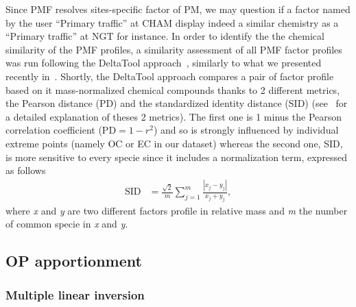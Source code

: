 \documentclass[acp]{copernicus}
\begin{document}
Since PMF resolves sites-specific factor of PM, we may question if a
factor named by the user ``Primary traffic'' at CHAM display indeed a
similar chemistry as a ``Primary traffic'' at NGT for instance. In order
to identify the the chemical similarity of the PMF profiles, a
similarity assessment of all PMF factor profiles was run following the
DeltaTool approach~\citep{pernigottiDeltaSA2018}, similarly to what we
presented recently in~\citet{weberComparison2019}. Shortly, the DeltaTool
approach compares a pair of factor profile based on it mass-normalized
chemical compounds thanks to 2 different metrics, the Pearson distance
(PD) and the standardized identity distance (SID) 
(see~\citet{belisNew2015a} for a detailed explanation of theses 2 metrics). The first one
is 1 minus the Pearson correlation coefficient
(\(\text{PD} = 1 - r^{2}\)) and so is strongly influenced by individual
extreme points (namely OC or EC in our dataset) whereas the second one,
SID, is more sensitive to every specie since it includes a normalization
term, expressed as follows
\begin{align}
    \text{SID} &= \frac{\sqrt{2}}{m}\sum_{j = 1}^{m}\frac{\left| x_{j} - y_{j} \right|}{x_{j} + y_{j}},
\end{align}
where \emph{x} and \emph{y} are two different factors profile in
relative mass and \emph{m} the number of common specie in \emph{x} and
\emph{y}.

\subsection{OP apportionment}%
\label{op-apportionment}

\subsubsection{Multiple linear inversion}%
\label{multiple-linear-inversion}
\end{document}
